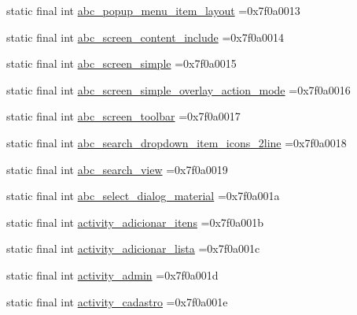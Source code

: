 \begin{DoxyCompactItemize}
\item 
static final int \mbox{\hyperlink{classbr_1_1unb_1_1cic_1_1mp_1_1marketmaster_1_1R_1_1layout_aeddbc8fcc2010d0d164014873347ece0}{abc\+\_\+popup\+\_\+menu\+\_\+item\+\_\+layout}} =0x7f0a0013
\item 
static final int \mbox{\hyperlink{classbr_1_1unb_1_1cic_1_1mp_1_1marketmaster_1_1R_1_1layout_a906c2ec84ed54301bc3efaf901204824}{abc\+\_\+screen\+\_\+content\+\_\+include}} =0x7f0a0014
\item 
static final int \mbox{\hyperlink{classbr_1_1unb_1_1cic_1_1mp_1_1marketmaster_1_1R_1_1layout_ab699ac98d57d94234d9902346d7e4d2c}{abc\+\_\+screen\+\_\+simple}} =0x7f0a0015
\item 
static final int \mbox{\hyperlink{classbr_1_1unb_1_1cic_1_1mp_1_1marketmaster_1_1R_1_1layout_aa1f99497d9fcf13dfd70a2eafd305393}{abc\+\_\+screen\+\_\+simple\+\_\+overlay\+\_\+action\+\_\+mode}} =0x7f0a0016
\item 
static final int \mbox{\hyperlink{classbr_1_1unb_1_1cic_1_1mp_1_1marketmaster_1_1R_1_1layout_a203dbd322c148e9b64e1ee65716f04d5}{abc\+\_\+screen\+\_\+toolbar}} =0x7f0a0017
\item 
static final int \mbox{\hyperlink{classbr_1_1unb_1_1cic_1_1mp_1_1marketmaster_1_1R_1_1layout_a7c6d0996f9c3caafffd1daa5b03ce8a2}{abc\+\_\+search\+\_\+dropdown\+\_\+item\+\_\+icons\+\_\+2line}} =0x7f0a0018
\item 
static final int \mbox{\hyperlink{classbr_1_1unb_1_1cic_1_1mp_1_1marketmaster_1_1R_1_1layout_a1dc9b4f668ba629050daed0bf21ad1ce}{abc\+\_\+search\+\_\+view}} =0x7f0a0019
\item 
static final int \mbox{\hyperlink{classbr_1_1unb_1_1cic_1_1mp_1_1marketmaster_1_1R_1_1layout_a28c37ed01e9ca2db62cd57ddda024cd2}{abc\+\_\+select\+\_\+dialog\+\_\+material}} =0x7f0a001a
\item 
static final int \mbox{\hyperlink{classbr_1_1unb_1_1cic_1_1mp_1_1marketmaster_1_1R_1_1layout_a03777eb9397d5f4cbb21adeb2b4c6ca4}{activity\+\_\+adicionar\+\_\+itens}} =0x7f0a001b
\item 
static final int \mbox{\hyperlink{classbr_1_1unb_1_1cic_1_1mp_1_1marketmaster_1_1R_1_1layout_ace07bd9820e24d33816e114510d8de77}{activity\+\_\+adicionar\+\_\+lista}} =0x7f0a001c
\item 
static final int \mbox{\hyperlink{classbr_1_1unb_1_1cic_1_1mp_1_1marketmaster_1_1R_1_1layout_a2d96c4af6cf3a18e00e7441b43bcf4ef}{activity\+\_\+admin}} =0x7f0a001d
\item 
static final int \mbox{\hyperlink{classbr_1_1unb_1_1cic_1_1mp_1_1marketmaster_1_1R_1_1layout_a8e0d26f757f8b15608a80728b250d788}{activity\+\_\+cadastro}} =0x7f0a001e

\end{DoxyCompactItemize}
